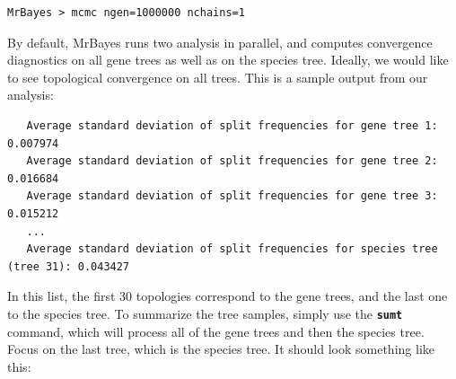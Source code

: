 \documentclass[12pt]{book}
\newcommand{\ttt}[1]{\texttt{#1}}
\newcommand{\tb}[1]{\ttt{\textbf{#1}}}
\begin{document}
\begin{singlespacing}
\small
\begin{verbatim}
MrBayes > mcmc ngen=1000000 nchains=1
\end{verbatim}
\end{singlespacing}
\normalsize

By default, MrBayes runs two analysis in parallel, and computes convergence diagnostics on all gene
trees as well as on the species tree. Ideally, we would like to see topological convergence on all
trees. This is a sample output from our analysis:

\footnotesize
\begin{singlespacing}
\begin{verbatim}
   Average standard deviation of split frequencies for gene tree 1: 0.007974
   Average standard deviation of split frequencies for gene tree 2: 0.016684
   Average standard deviation of split frequencies for gene tree 3: 0.015212
   ...
   Average standard deviation of split frequencies for species tree (tree 31): 0.043427
\end{verbatim}
\end{singlespacing}
\normalsize

In this list, the first 30 topologies correspond to the gene trees, and the last one to the species
tree. To summarize the tree samples, simply use the \tb{sumt} command, which will process all of
the gene trees and then the species tree. Focus on the last tree, which is the species tree. It
should look something like this:
\end{document}
